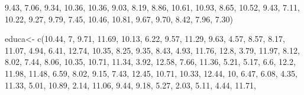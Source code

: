 \documentclass[
  letterpaper,
  DIV=11,
  numbers=noendperiod]{scrartcl}
\newenvironment{Shaded}{\begin{snugshade}}{\end{snugshade}}
\newcommand{\DecValTok}[1]{\textcolor[rgb]{0.68,0.00,0.00}{#1}}
\newcommand{\FloatTok}[1]{\textcolor[rgb]{0.68,0.00,0.00}{#1}}
\newcommand{\FunctionTok}[1]{\textcolor[rgb]{0.28,0.35,0.67}{#1}}
\newcommand{\NormalTok}[1]{\textcolor[rgb]{0.00,0.23,0.31}{#1}}
\newcommand{\OtherTok}[1]{\textcolor[rgb]{0.00,0.23,0.31}{#1}}
\begin{document}
\begin{Shaded}
\begin{Highlighting}[]
               \FloatTok{9.43}\NormalTok{, }\FloatTok{7.06}\NormalTok{, }\FloatTok{9.34}\NormalTok{, }\FloatTok{10.36}\NormalTok{, }\FloatTok{10.36}\NormalTok{, }\FloatTok{9.03}\NormalTok{, }\FloatTok{8.19}\NormalTok{, }\FloatTok{8.86}\NormalTok{, }\FloatTok{10.61}\NormalTok{, }\FloatTok{10.93}\NormalTok{,}
               \FloatTok{8.65}\NormalTok{, }\FloatTok{10.52}\NormalTok{, }\FloatTok{9.43}\NormalTok{, }\FloatTok{7.11}\NormalTok{, }\FloatTok{10.22}\NormalTok{, }\FloatTok{9.27}\NormalTok{, }\FloatTok{9.79}\NormalTok{, }\FloatTok{7.45}\NormalTok{, }\FloatTok{10.46}\NormalTok{, }\FloatTok{10.81}\NormalTok{,}
               \FloatTok{9.67}\NormalTok{, }\FloatTok{9.70}\NormalTok{, }\FloatTok{8.42}\NormalTok{, }\FloatTok{7.96}\NormalTok{, }\FloatTok{7.30}\NormalTok{)}

\NormalTok{educa}\OtherTok{\textless{}{-}} \FunctionTok{c}\NormalTok{(}\FloatTok{10.44}\NormalTok{, }\DecValTok{7}\NormalTok{, }\FloatTok{9.71}\NormalTok{, }\FloatTok{11.69}\NormalTok{, }\FloatTok{10.13}\NormalTok{, }\FloatTok{6.22}\NormalTok{, }\FloatTok{9.57}\NormalTok{, }\FloatTok{11.29}\NormalTok{, }\FloatTok{9.63}\NormalTok{, }\FloatTok{4.57}\NormalTok{, }\FloatTok{8.57}\NormalTok{,}
          \FloatTok{8.17}\NormalTok{, }\FloatTok{11.07}\NormalTok{, }\FloatTok{4.94}\NormalTok{, }\FloatTok{6.41}\NormalTok{, }\FloatTok{12.74}\NormalTok{, }\FloatTok{10.35}\NormalTok{, }\FloatTok{8.25}\NormalTok{, }\FloatTok{9.35}\NormalTok{, }\FloatTok{8.43}\NormalTok{, }\FloatTok{4.93}\NormalTok{, }\FloatTok{11.76}\NormalTok{,}
          \FloatTok{12.8}\NormalTok{, }\FloatTok{3.79}\NormalTok{, }\FloatTok{11.97}\NormalTok{, }\FloatTok{8.12}\NormalTok{, }\FloatTok{8.02}\NormalTok{, }\FloatTok{7.44}\NormalTok{, }\FloatTok{8.06}\NormalTok{, }\FloatTok{10.35}\NormalTok{, }\FloatTok{10.71}\NormalTok{, }\FloatTok{11.34}\NormalTok{, }\FloatTok{3.92}\NormalTok{,}
          \FloatTok{12.58}\NormalTok{, }\FloatTok{7.66}\NormalTok{, }\FloatTok{11.36}\NormalTok{, }\FloatTok{5.21}\NormalTok{, }\FloatTok{5.17}\NormalTok{, }\FloatTok{6.6}\NormalTok{, }\FloatTok{12.2}\NormalTok{, }\FloatTok{11.98}\NormalTok{, }\FloatTok{11.48}\NormalTok{, }\FloatTok{6.59}\NormalTok{, }\FloatTok{8.02}\NormalTok{,}
          \FloatTok{9.15}\NormalTok{, }\FloatTok{7.43}\NormalTok{, }\FloatTok{12.45}\NormalTok{, }\FloatTok{10.71}\NormalTok{, }\FloatTok{10.33}\NormalTok{, }\FloatTok{12.44}\NormalTok{, }\DecValTok{10}\NormalTok{, }\FloatTok{6.47}\NormalTok{, }\FloatTok{6.08}\NormalTok{, }\FloatTok{4.35}\NormalTok{, }\FloatTok{11.33}\NormalTok{,}
          \FloatTok{5.01}\NormalTok{, }\FloatTok{10.89}\NormalTok{, }\FloatTok{2.14}\NormalTok{, }\FloatTok{11.06}\NormalTok{, }\FloatTok{9.44}\NormalTok{, }\FloatTok{9.18}\NormalTok{, }\FloatTok{5.27}\NormalTok{, }\FloatTok{2.03}\NormalTok{, }\FloatTok{5.11}\NormalTok{, }\FloatTok{4.44}\NormalTok{, }\FloatTok{11.71}\NormalTok{,}

\end{Highlighting}
\end{Shaded}
\end{document}
